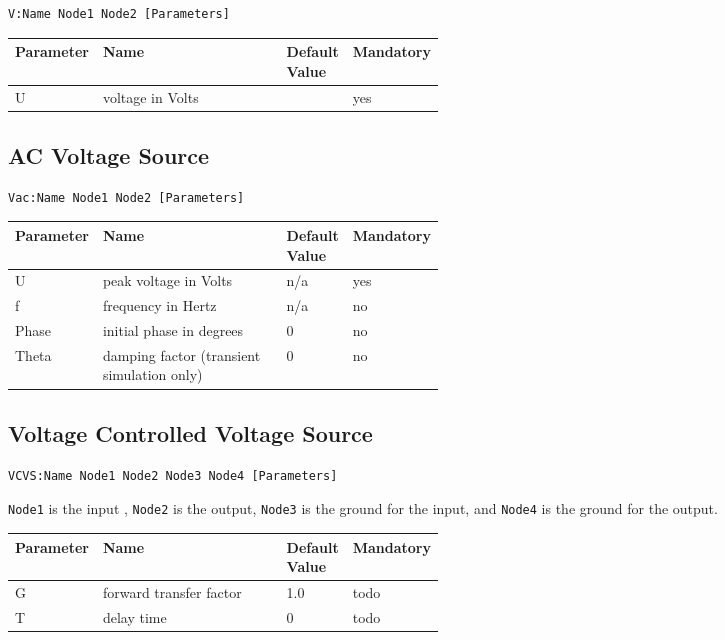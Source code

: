 \begin{verbatim}
V:Name Node1 Node2 [Parameters]
\end{verbatim}


\begin{tabular}{|l|p{0.5\linewidth}|l|l|}
\hline
Parameter & Name & Default Value & Mandatory \\
\hline
U & voltage in Volts & & yes \\
\hline
\end{tabular}


\subsection{AC Voltage Source}

\begin{verbatim}
Vac:Name Node1 Node2 [Parameters]
\end{verbatim}


\begin{tabular}{|l|p{0.5\linewidth}|l|l|}
\hline
Parameter & Name & Default Value & Mandatory \\
\hline
U & peak voltage in Volts & n/a & yes \\
f & frequency in Hertz & n/a & no \\
Phase & initial phase in degrees & 0 & no \\
Theta & damping factor (transient simulation only) & 0 & no \\
\hline
\end{tabular}



\subsection{Voltage Controlled Voltage Source}

\begin{verbatim}
VCVS:Name Node1 Node2 Node3 Node4 [Parameters]
\end{verbatim}

\verb+Node1+ is the input , \verb+Node2+ is the output, \verb+Node3+ is the ground for the input, and \verb+Node4+ is the ground for the output.


\begin{tabular}{|l|p{0.5\linewidth}|l|l|}
\hline
Parameter & Name & Default Value & Mandatory \\
\hline
G & forward transfer factor & 1.0 & todo \\
T & delay time & 0 & todo \\
\hline
\end{tabular}


